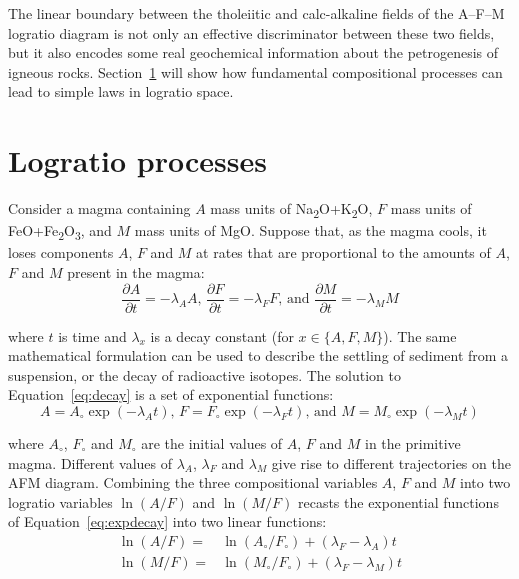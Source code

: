 The linear boundary between the tholeiitic and calc-alkaline fields of
the A--F--M logratio diagram is not only an effective discriminator
between these two fields, but it also encodes some real geochemical
information about the petrogenesis of igneous
rocks. Section~\ref{sec:logratio-processes} will show how fundamental
compositional processes can lead to simple laws in logratio space.

\section{Logratio processes}
\label{sec:logratio-processes}

Consider a magma containing $A$ mass units of
Na\textsubscript{2}O+K\textsubscript{2}O, $F$ mass units of
FeO+Fe\textsubscript{2}O\textsubscript{3}, and $M$ mass units of
MgO. Suppose that, as the magma cools, it loses components $A$, $F$
and $M$ at rates that are proportional to the amounts of $A$, $F$ and
$M$ present in the magma:
\begin{equation}
  \frac{\partial A}{\partial t} = -\lambda_A A \mbox{,~}
  \frac{\partial F}{\partial t} = -\lambda_F F \mbox{,~and~}
  \frac{\partial M}{\partial t} = -\lambda_M M
  \label{eq:decay}
\end{equation}

\noindent where $t$ is time and $\lambda_x$ is a decay constant (for
$x \in \{A, F, M\}$). The same mathematical formulation can be used to
describe the settling of sediment from a suspension, or the decay of
radioactive isotopes.  The solution to Equation~\ref{eq:decay} is a
set of exponential functions:
\begin{equation}
  A = A_\circ \exp(-\lambda_A t) \mbox{,~}
  F = F_\circ \exp(-\lambda_F t) \mbox{,~and~}
  M = M_\circ \exp(-\lambda_M t)
  \label{eq:expdecay}
\end{equation}

\noindent where $A_\circ$, $F_\circ$ and $M_\circ$ are the initial
values of $A$, $F$ and $M$ in the primitive magma. Different values of
$\lambda_A$, $\lambda_F$ and $\lambda_M$ give rise to different
trajectories on the AFM diagram. Combining the three compositional
variables $A$, $F$ and $M$ into two logratio variables $\ln(A/F)$ and
$\ln(M/F)$ recasts the exponential functions of
Equation~\ref{eq:expdecay} into two linear functions:
\begin{align}
  \ln(A/F) = & \ln(A_\circ/F_\circ) + (\lambda_F-\lambda_A)t\\
  \ln(M/F) = & \ln(M_\circ/F_\circ) + (\lambda_F-\lambda_M)t
\end{align}


